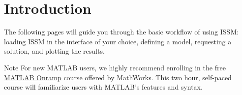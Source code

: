 
\section{Introduction}
The following pages will guide you through the basic workflow of using ISSM: loading ISSM in the interface of your choice, defining a model, requesting a solution, and plotting the results.


\begin{calloutHighlight}{Note}
For new MATLAB users, we highly recommend enrolling in the free \href{https://matlabacademy.mathworks.com/details/matlab-onramp/gettingstarted}{MATLAB Onramp} course offered by MathWorks. This two hour, self-paced course will familiarize users with MATLAB's features and syntax.
\end{calloutHighlight}

\clearpage %
